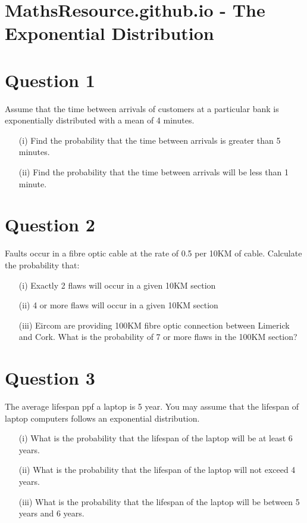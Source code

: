 \documentclass[]{report}
\begin{document}
\section*{MathsResource.github.io - The Exponential Distribution}	
\section*{Question 1}

Assume that the time between arrivals of customers at a particular bank is exponentially distributed with a mean of 4 minutes. 

\begin{itemize}
\item[(i)]
Find the probability that the time between arrivals is greater than 5 minutes.
\item[(ii)]
Find the probability that the time between arrivals will be less than 1 minute.
\end{itemize}

\section*{Question 2}

Faults occur in a fibre optic cable at the rate of 0.5 per 10KM of cable.  Calculate the probability that:

\begin{itemize}
\item[(i)] Exactly 2 flaws will occur in a given 10KM section
\item[(ii)] 4 or more flaws will occur in a given 10KM section
\item[(iii)] Eircom are providing 100KM fibre optic connection between Limerick and Cork.  What is the probability of 7 or more flaws in the 100KM section?	
\end{itemize}				

\section*{Question 3}
The average lifespan ppf a laptop is 5 year. You may assume that the lifespan of laptop computers follows an exponential distribution.
\begin{itemize}
	\item[(i)] What is the probability that the lifespan of the laptop will be at least 6 years.
	\item[(ii)] What is the probability that the lifespan of the laptop will not exceed 4 years.
	\item[(iii)] What is the probability that the lifespan of the laptop will be between 5 years and 6 years.
\end{itemize}
\end{document}
